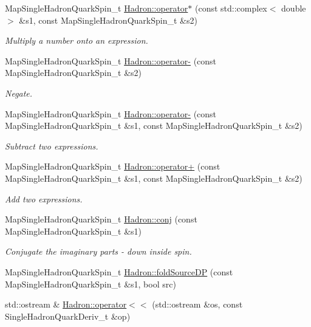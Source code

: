 \begin{DoxyCompactItemize}
Map\+Single\+Hadron\+Quark\+Spin\+\_\+t \mbox{\hyperlink{namespaceHadron_ab9e06323f5f25fbcb53926b3898935a6}{Hadron\+::operator$\ast$}} (const std\+::complex$<$ double $>$ \&s1, const Map\+Single\+Hadron\+Quark\+Spin\+\_\+t \&s2)
\begin{DoxyCompactList}\small\item\em Multiply a number onto an expression. \end{DoxyCompactList}\item 
Map\+Single\+Hadron\+Quark\+Spin\+\_\+t \mbox{\hyperlink{namespaceHadron_af6e03647b0a1cac007a84d630c583dcb}{Hadron\+::operator-\/}} (const Map\+Single\+Hadron\+Quark\+Spin\+\_\+t \&s2)
\begin{DoxyCompactList}\small\item\em Negate. \end{DoxyCompactList}\item 
Map\+Single\+Hadron\+Quark\+Spin\+\_\+t \mbox{\hyperlink{namespaceHadron_a47e695607c9fe7e70da22c43d0065b91}{Hadron\+::operator-\/}} (const Map\+Single\+Hadron\+Quark\+Spin\+\_\+t \&s1, const Map\+Single\+Hadron\+Quark\+Spin\+\_\+t \&s2)
\begin{DoxyCompactList}\small\item\em Subtract two expressions. \end{DoxyCompactList}\item 
Map\+Single\+Hadron\+Quark\+Spin\+\_\+t \mbox{\hyperlink{namespaceHadron_a9ca80acd77b748f912b330709f8c294a}{Hadron\+::operator+}} (const Map\+Single\+Hadron\+Quark\+Spin\+\_\+t \&s1, const Map\+Single\+Hadron\+Quark\+Spin\+\_\+t \&s2)
\begin{DoxyCompactList}\small\item\em Add two expressions. \end{DoxyCompactList}\item 
Map\+Single\+Hadron\+Quark\+Spin\+\_\+t \mbox{\hyperlink{namespaceHadron_a5b62c8e194d4e04483d980199eff43fa}{Hadron\+::conj}} (const Map\+Single\+Hadron\+Quark\+Spin\+\_\+t \&s1)
\begin{DoxyCompactList}\small\item\em Conjugate the imaginary parts -\/ down inside spin. \end{DoxyCompactList}\item 
Map\+Single\+Hadron\+Quark\+Spin\+\_\+t \mbox{\hyperlink{namespaceHadron_a3ea046027140669df443a45763de3e2c}{Hadron\+::fold\+Source\+DP}} (const Map\+Single\+Hadron\+Quark\+Spin\+\_\+t \&s1, bool src)
\item 
std\+::ostream \& \mbox{\hyperlink{namespaceHadron_af6547a2cdd6369eda030067e469096bf}{Hadron\+::operator$<$$<$}} (std\+::ostream \&os, const Single\+Hadron\+Quark\+Deriv\+\_\+t \&op)

\end{DoxyCompactItemize}
